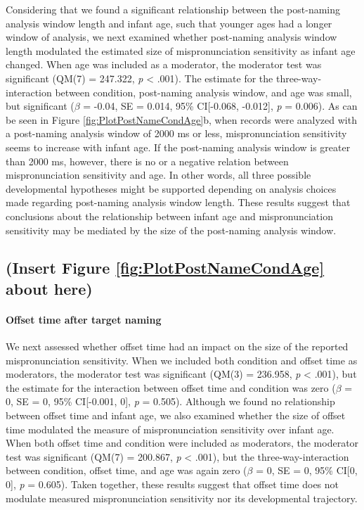 \documentclass[man]{apa6}
\let\oldparagraph\paragraph
\renewcommand{\paragraph}[1]{\oldparagraph{#1}\mbox{}}
\begin{document}
Considering that we found a significant relationship between the post-naming analysis window length and infant age, such that younger ages had a longer window of analysis, we next examined whether post-naming analysis window length modulated the estimated size of mispronunciation sensitivity as infant age changed. When age was included as a moderator, the moderator test was significant (QM(7) = 247.322, \emph{p} \textless{} .001). The estimate for the three-way-interaction between condition, post-naming analysis window, and age was small, but significant (\(\beta\) = -0.04, SE = 0.014, 95\% CI{[}-0.068, -0.012{]}, \emph{p} = 0.006). As can be seen in Figure \ref{fig:PlotPostNameCondAge}b, when records were analyzed with a post-naming analysis window of 2000 ms or less, mispronunciation sensitivity seems to increase with infant age. If the post-naming analysis window is greater than 2000 ms, however, there is no or a negative relation between mispronunciation sensitivity and age. In other words, all three possible developmental hypotheses might be supported depending on analysis choices made regarding post-naming analysis window length. These results suggest that conclusions about the relationship between infant age and mispronunciation sensitivity may be mediated by the size of the post-naming analysis window.

\hypertarget{insert-figure-reffigplotpostnamecondage-about-here}{%
\subsection{(Insert Figure \ref{fig:PlotPostNameCondAge} about here)}\label{insert-figure-reffigplotpostnamecondage-about-here}}

\hypertarget{offset-time-after-target-naming}{%
\paragraph{Offset time after target naming}\label{offset-time-after-target-naming}}

We next assessed whether offset time had an impact on the size of the reported mispronunciation sensitivity. When we included both condition and offset time as moderators, the moderator test was significant (QM(3) = 236.958, \emph{p} \textless{} .001), but the estimate for the interaction between offset time and condition was zero (\(\beta\) = 0, SE = 0, 95\% CI{[}-0.001, 0{]}, \emph{p} = 0.505). Although we found no relationship between offset time and infant age, we also examined whether the size of offset time modulated the measure of mispronunciation sensitivity over infant age. When both offset time and condition were included as moderators, the moderator test was significant (QM(7) = 200.867, \emph{p} \textless{} .001), but the three-way-interaction between condition, offset time, and age was again zero (\(\beta\) = 0, SE = 0, 95\% CI{[}0, 0{]}, \emph{p} = 0.605). Taken together, these results suggest that offset time does not modulate measured mispronunciation sensitivity nor its developmental trajectory.
\end{document}
